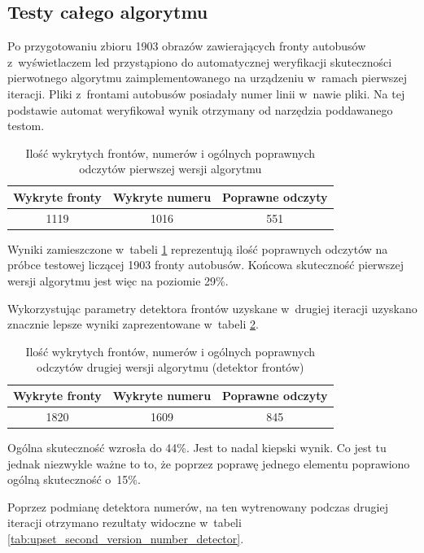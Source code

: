 \subsection{Testy całego algorytmu}

Po przygotowaniu zbioru 1903 obrazów zawierających fronty autobusów
z~wyświetlaczem led przystąpiono do automatycznej weryfikacji 
skuteczności pierwotnego algorytmu zaimplementowanego na urządzeniu
w~ramach pierwszej iteracji.
Pliki z~frontami autobusów posiadały numer linii w~nawie pliki. 
Na tej podstawie automat weryfikował wynik otrzymany od narzędzia
poddawanego testom.


\begin{table}[!h]
    \centering
    \begin{tabular}{c|c|c}
        Wykryte fronty  & Wykryte numeru & Poprawne odczyty \\ \hline
        1119 & 1016 & 551
    \end{tabular}
    \caption{Ilość wykrytych frontów, numerów i ogólnych poprawnych 
    odczytów pierwszej wersji algorytmu}
    \label{tab:first_version_results}
\end{table}

Wyniki zamieszczone w~tabeli \ref{tab:first_version_results}
reprezentują ilość poprawnych odczytów na próbce testowej
liczącej 1903 fronty autobusów. Końcowa skuteczność
pierwszej wersji algorytmu jest więc na poziomie 29\%.

Wykorzystując parametry detektora frontów uzyskane w~drugiej
iteracji uzyskano znacznie lepsze wyniki zaprezentowane w~tabeli
\ref{tab:second_version_results}.

\begin{table}[!h]
    \centering
    \begin{tabular}{c|c|c}
        Wykryte fronty  & Wykryte numeru & Poprawne odczyty \\ \hline
        1820 & 1609 & 845
    \end{tabular}
    \caption{Ilość wykrytych frontów, numerów i ogólnych poprawnych 
    odczytów drugiej wersji algorytmu (detektor frontów)}
    \label{tab:second_version_results}
\end{table}

Ogólna skuteczność wzrosła do 44\%. Jest to nadal kiepski wynik.
Co jest tu jednak niezwykle ważne to to, że 
poprzez poprawę jednego elementu
poprawiono ogólną skuteczność o~15\%.

Poprzez podmianę detektora numerów, na ten wytrenowany 
podczas drugiej iteracji otrzymano rezultaty widoczne
w~tabeli \ref{tab:upset_second_version_number_detector}.

